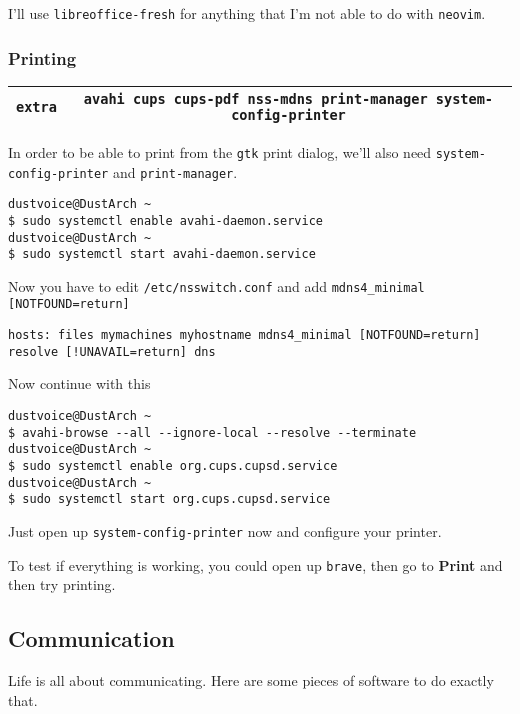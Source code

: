 \documentclass[9pt]{report}
\begin{document}
I’ll use \texttt{libreoffice-fresh} for anything that I’m not able to do with \texttt{neovim}.



\vfill\eject

\hypertarget{x-printing}{\subsubsection{Printing}}
\begin{center}
\begin{tabular}{|c|c|}
\hline
\texttt{extra} & \texttt{avahi cups cups-pdf nss-mdns print-manager system-config-printer} \\ 
\hline
\end{tabular}
\end{center}

In order to be able to print from the \texttt{gtk} print dialog, we’ll also need \texttt{system-config-printer} and \texttt{print-manager}.


\begin{verbatim}
dustvoice@DustArch ~
$ sudo systemctl enable avahi-daemon.service
dustvoice@DustArch ~
$ sudo systemctl start avahi-daemon.service
\end{verbatim}

Now you have to edit \texttt{/etc/nsswitch.conf} and add \texttt{mdns4\_minimal [NOTFOUND=return]}


\begin{verbatim}
hosts: files mymachines myhostname mdns4_minimal [NOTFOUND=return] resolve [!UNAVAIL=return] dns
\end{verbatim}

Now continue with this


\begin{verbatim}
dustvoice@DustArch ~
$ avahi-browse --all --ignore-local --resolve --terminate
dustvoice@DustArch ~
$ sudo systemctl enable org.cups.cupsd.service
dustvoice@DustArch ~
$ sudo systemctl start org.cups.cupsd.service
\end{verbatim}

Just open up \texttt{system-config-printer} now and configure your printer.


To test if everything is working, you could open up \texttt{brave}, then go to \textbf{Print} and then try printing.



\vfill\eject

\hypertarget{x-communication}{\subsection{Communication}}
Life is all about communicating.
Here are some pieces of software to do exactly that.
\end{document}
